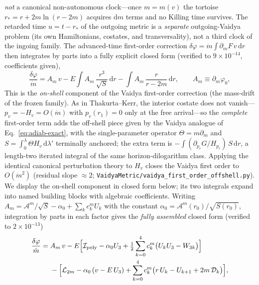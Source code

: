 \documentclass[12pt]{iopart}
\newcommand{\dd}{\mathrm{d}}
\begin{document}
\emph{not} a canonical non-autonomous clock---once $m=m(v)$ the tortoise
$r_*=r+2m\ln(r-2m)$ acquires $\dd m$ terms and no Killing time survives. The retarded
time $u=t-r_*$ of the outgoing metric is a \emph{separate} outgoing-Vaidya problem
(its own Hamiltonians, costates, and transversality), not a third clock of the ingoing
family. The advanced-time first-order correction
$\delta\varphi=\dot m\!\int\!\partial_m F\,v\,\dd r$ then integrates by parts into a
fully explicit closed form (verified to $9\times10^{-14}$, coefficients given),
\begin{equation}
    \frac{\delta\varphi}{\dot m}
    =A_m\,v-E\!\int\! A_m\,\frac{r^3}{\sqrt S}\,\dd r
    -\int\! A_m\,\frac{r}{r-2m}\,\dd r,\qquad A_m\equiv\partial_m\varphi_0,
    \label{eq:vaidya-deltaphi}
\end{equation}
This is the \emph{on-shell} component of the Vaidya first-order correction (the
mass-drift of the frozen family). As in Thakurta--Kerr, the interior costate does not
vanish---$p_v=-H_v=O(\dot m)$ with $p_v(r_1)=0$ only at the free arrival---so the
\emph{complete} first-order term adds the off-shell piece given by the Vaidya analogue
of Eq.~\eqref{eq:adiab-exact}, with the single-parameter operator $\Theta=m\partial_m$
and $S=\int_0^\lambda\Theta H_v\,\dd\lambda'$ terminally anchored; the extra term is
$-\!\int(\partial_{p_r}G/H_{p_r})\,S\,\dd r$, a length-two iterated integral of the
same horizon-dilogarithm class. Applying the identical canonical perturbation theory
to $H_v$ closes the Vaidya first order to $O(\dot m^2)$ (residual slope $\approx2$;
\texttt{VaidyaMetric/vaidya\_first\_order\_offshell.py}). We display the on-shell
component in closed form below;
its two integrals expand into named building blocks with algebraic coefficients.
Writing $A_m=\mathcal{A}^m/\sqrt S-\alpha_0+\sum_k c_k^m U_k$ with the constant
$\alpha_0=\mathcal{A}^m(r_0)/\sqrt{S(r_0)}$, integration by parts in each factor gives
the \emph{fully assembled} closed form (verified to $2\times10^{-13}$)
\begin{equation}
\begin{aligned}
    \frac{\delta\varphi}{\dot m}
    ={}&A_m\,v
    -E\Big[\mathcal{I}_{\rm poly}-\alpha_0 U_3
        +\tfrac12\sum_{k=0}^4 c_k^m\big(U_kU_3-W_{3k}\big)\Big]\\
    &{}-\Big[\mathcal{L}_{2m}-\alpha_0\,(v-E\,U_3)
        +\sum_{k=0}^4 c_k^m\big(r\,U_k-U_{k+1}+2m\,\mathcal{D}_k\big)\Big],
\end{aligned}
    \label{eq:vaidya-full}
\end{equation}
\end{document}
